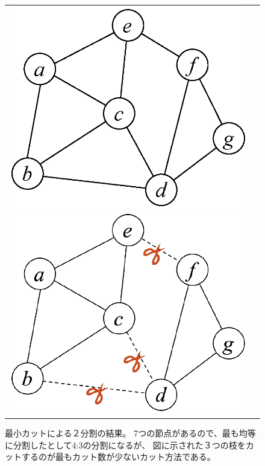 \begin{figure}[htbp]
\begin{center}
\begin{tabular}{cc}

\begin{minipage}{0.3\hsize}
\begin{center}
\includegraphics[scale=0.5]{./metis_inpg.eps}
\caption{分割対象のグラフ\label{fig:mgpmetis_graph}}
\end{center}
\end{minipage}

\begin{minipage}{0.7\hsize}
\begin{center}
\includegraphics[scale=0.5]{./metis_gcut.eps}
\caption{最小カットによる２分割の結果。
7つの節点があるので、最も均等に分割したとして4:3の分割になるが、
図に示された３つの枝をカットするのが最もカット数が少ないカット方法である。\label{fig:mgpmetis_gcut}}
\end{center}
\end{minipage}

\end{tabular} 
\end{center}
\end{figure} 


